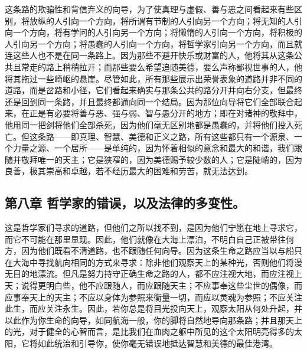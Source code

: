 这条路的欺骗性和背信弃义的向导，为了使真理与虚假、善与恶之间看起来有些区别，将放纵的人引向一个方向，将所谓有节制的人引向另一个方向；将无知的人引向一个方向，将有学问的人引向另一个方向；将懒惰的人引向一个方向，将积极的人引向另一个方向；将愚蠢的人引向一个方向，将哲学家引向另一个方向，而且就连这些人也不是在同一条路上。因为那些不避开快乐或财富的人，他将其从这条公共且常走的路上稍稍拉开；而那些要么希望追随美德，要么声称鄙视世事的人，他将其拖过一些崎岖的悬崖。尽管如此，所有那些展示出荣誉表象的道路并非不同的道路，而是岔路和小径，它们看起来确实与那条公共的路分开并向右分支，但最终还是回到同一条路，并且最终都通向同一个结局。因为那位向导将它们全部联合起来，在正是有必要将善与恶、强与弱、智与愚分开的地方；即在对诸神的敬拜中，他用同一把剑将他们全部杀死，因为他们毫无区别地都是愚蠢的，并将他们投入死亡。但这条路——即真理、智慧、美德和正义之路，所有这些都只有一个源泉、一个力量之源、一个居所——是单纯的，因为怀着相似的意念和最大的和谐，我们跟随并敬拜唯一的天主；它是狭窄的，因为美德赐予较少数的人；它是陡峭的，因为良善，极其崇高和卓越，若不经历最大的困难和劳苦，就无法达到。\par


\subsection{第八章 哲学家的错误，以及法律的多变性。}

这是哲学家们寻求的道路，但他们之所以找不到，是因为他们宁愿在地上寻求它，而它不可能在那里显现。因此，他们就像在大海上漂泊，不明白自己正被带往何方，因为他们既看不清道路，也不跟随任何向导。因为这条生命之路应当以与船只在大海中寻找航向相同的方式来寻求：除非他们观察天上的某种光，否则他们将漫无目的地漂流。但凡是努力持守正确生命之路的人，都不应注视大地，而应注视上天；说得更明白些，他不应跟随人，而应跟随天主；不应事奉这些尘世的偶像，而应事奉天上的天主；不应以身体为参照来衡量一切，而应以灵魂为参照；不应关注此生，而应关注永生。因此，若你总是将目光投向天上，观察太阳从何处升起，并以此作为你生命的向导，如同航海一般，你的脚将自然地导向那条路；并且那天上的光，对于健全的心智而言，是比我们在血肉之躯中所见的这个太阳明亮得多的太阳，它将如此统治和引导你，使你毫无错误地抵达智慧和美德的最佳港湾。\par

